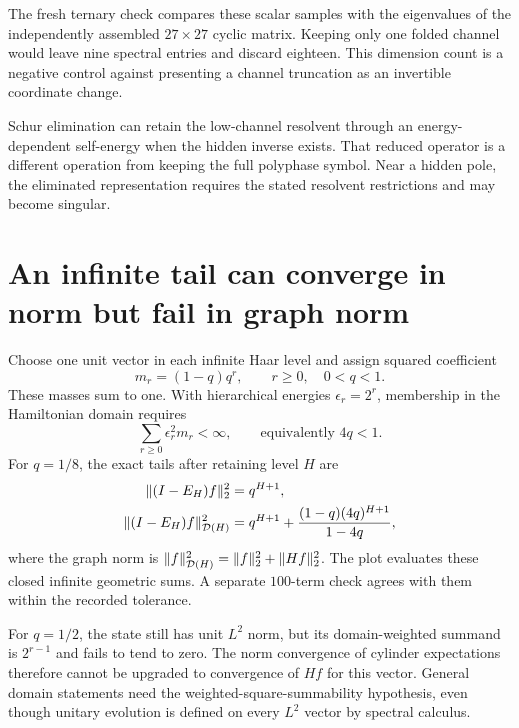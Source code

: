 The fresh ternary check compares these scalar samples with the eigenvalues of the independently assembled $27\times27$ cyclic matrix. Keeping only one folded channel would leave nine spectral entries and discard eighteen. This dimension count is a negative control against presenting a channel truncation as an invertible coordinate change.

Schur elimination can retain the low-channel resolvent through an energy-dependent self-energy when the hidden inverse exists. That reduced operator is a different operation from keeping the full polyphase symbol. Near a hidden pole, the eliminated representation requires the stated resolvent restrictions and may become singular.



\clearpage
\section{An infinite tail can converge in norm but fail in graph norm}

Choose one unit vector in each infinite Haar level and assign squared coefficient
\[
m_r=(1-q)q^r,\qquad r\ge0,\quad0<q<1.
\]
These masses sum to one. With hierarchical energies $\epsilon_r=2^r$, membership in the Hamiltonian domain requires
\[
\sum_{r\ge0}\epsilon_r^2m_r<\infty,
\qquad\text{equivalently }4q<1.
\]
For $q=1/8$, the exact tails after retaining level $H$ are
\[
\begin{aligned}
\|(I-E_H)f\|_2^2&=q^{H+1},\\
\|(I-E_H)f\|_{\mathcal D(H)}^2
&=q^{H+1}+\frac{(1-q)(4q)^{H+1}}{1-4q},
\end{aligned}
\]
where the graph norm is $\|f\|_{\mathcal D(H)}^2=\|f\|_2^2+\|Hf\|_2^2$. The plot evaluates these closed infinite geometric sums. A separate $100$-term check agrees with them within the recorded tolerance.

For $q=1/2$, the state still has unit $L^2$ norm, but its domain-weighted summand is $2^{r-1}$ and fails to tend to zero. The norm convergence of cylinder expectations therefore cannot be upgraded to convergence of $Hf$ for this vector. General domain statements need the weighted-square-summability hypothesis, even though unitary evolution is defined on every $L^2$ vector by spectral calculus.



